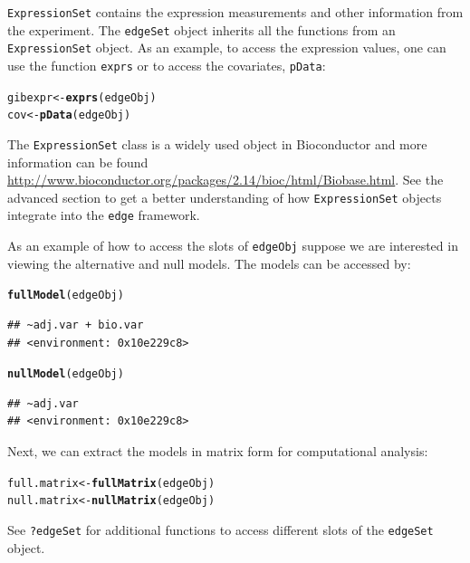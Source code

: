 \documentclass{article}\usepackage[]{graphicx}\usepackage[]{color}
\makeatletter
\newcommand{\hlstd}[1]{\textcolor[rgb]{0.345,0.345,0.345}{#1}}%
\newcommand{\hlkwb}[1]{\textcolor[rgb]{0.69,0.353,0.396}{#1}}%
\newcommand{\hlkwd}[1]{\textcolor[rgb]{0.737,0.353,0.396}{\textbf{#1}}}%
\newenvironment{kframe}{%
 \def\at@end@of@kframe{}%
 \ifinner\ifhmode%
  \def\at@end@of@kframe{\end{minipage}}%
  \begin{minipage}{\columnwidth}%
 \fi\fi%
 \def\FrameCommand##1{\hskip\@totalleftmargin \hskip-\fboxsep
 \colorbox{shadecolor}{##1}\hskip-\fboxsep
     \hskip-\linewidth \hskip-\@totalleftmargin \hskip\columnwidth}%
 \MakeFramed {\advance\hsize-\width
   \@totalleftmargin\z@ \linewidth\hsize
   \@setminipage}}%
 {\par\unskip\endMakeFramed%
 \at@end@of@kframe}
\newenvironment{knitrout}{}{} %
\makeatother
\begin{document}
{\tt ExpressionSet} contains the expression measurements and other information from the experiment. The {\tt edgeSet} object inherits all the functions from an {\tt ExpressionSet} object. As an example, to access the expression values, one can use the function {\tt exprs} or to access the covariates, {\tt pData}:
\begin{knitrout}
\color{fgcolor}\begin{kframe}
\begin{alltt}
\hlstd{gibexpr} \hlkwb{<-} \hlkwd{exprs}\hlstd{(edgeObj)}
\hlstd{cov} \hlkwb{<-} \hlkwd{pData}\hlstd{(edgeObj)}
\end{alltt}
\end{kframe}
\end{knitrout}
The {\tt ExpressionSet} class is a widely used object in Bioconductor and more information can be found \url{http://www.bioconductor.org/packages/2.14/bioc/html/Biobase.html}. See the advanced section to get a better understanding of how {\tt ExpressionSet} objects integrate into the {\tt edge} framework.

As an example of how to access the slots of {\tt edgeObj} suppose we are interested in viewing the alternative and null models. The models can be accessed by:
\begin{knitrout}
\color{fgcolor}\begin{kframe}
\begin{alltt}
\hlkwd{fullModel}\hlstd{(edgeObj)}
\end{alltt}
\begin{verbatim}
## ~adj.var + bio.var
## <environment: 0x10e229c8>
\end{verbatim}
\begin{alltt}
\hlkwd{nullModel}\hlstd{(edgeObj)}
\end{alltt}
\begin{verbatim}
## ~adj.var
## <environment: 0x10e229c8>
\end{verbatim}
\end{kframe}
\end{knitrout}
Next, we can extract the models in matrix form for computational analysis:
\begin{knitrout}
\color{fgcolor}\begin{kframe}
\begin{alltt}
\hlstd{full.matrix} \hlkwb{<-} \hlkwd{fullMatrix}\hlstd{(edgeObj)}
\hlstd{null.matrix} \hlkwb{<-} \hlkwd{nullMatrix}\hlstd{(edgeObj)}
\end{alltt}
\end{kframe}
\end{knitrout}
See {\tt ?edgeSet} for additional functions to access different slots of the {\tt edgeSet} object. 
\end{document}
